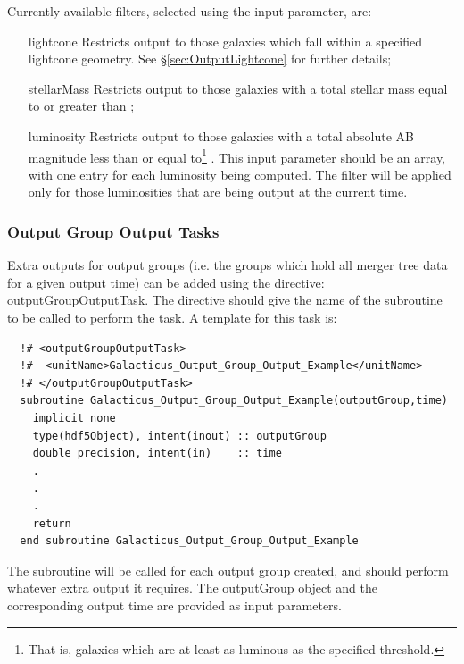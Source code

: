 Currently available filters, selected using the {\normalfont \ttfamily [mergerTreeOutputFilters]} input parameter, are:
\begin{itemize}
 \item [{\normalfont \ttfamily lightcone}] Restricts output to those galaxies which fall within a specified lightcone geometry. See \S\ref{sec:OutputLightcone} for further details;
 \item [{\normalfont \ttfamily stellarMass}] Restricts output to those galaxies with a total stellar mass equal to or greater than {\normalfont \ttfamily [stellarMassFilterThreshold]};
 \item [{\normalfont \ttfamily luminosity}] Restricts output to those galaxies with a total absolute AB magnitude less than or equal to\footnote{That is, galaxies which are at least as luminous as the specified threshold.} {\normalfont \ttfamily [luminosityFilterAbsoluteMagnitudeThresholds]}. This input parameter should be an array, with one entry for each luminosity being computed. The filter will be applied only for those luminosities that are being output at the current time.
\end{itemize}

\subsubsection{Output Group Output Tasks}

Extra outputs for output groups (i.e. the groups which hold all merger tree data for a given output time) can be added using the directive: {\normalfont \ttfamily outputGroupOutputTask}. The directive should give the name of the subroutine to be called to perform the task. A template for this task is:
\begin{verbatim}
  !# <outputGroupOutputTask>
  !#  <unitName>Galacticus_Output_Group_Output_Example</unitName>
  !# </outputGroupOutputTask>
  subroutine Galacticus_Output_Group_Output_Example(outputGroup,time)
    implicit none
    type(hdf5Object), intent(inout) :: outputGroup
    double precision, intent(in)    :: time
    .
    .
    .
    return
  end subroutine Galacticus_Output_Group_Output_Example
\end{verbatim}
The subroutine will be called for each output group created, and should perform whatever extra output it requires. The {\normalfont \ttfamily outputGroup} object and the corresponding output {\normalfont \ttfamily time} are provided as input parameters.

